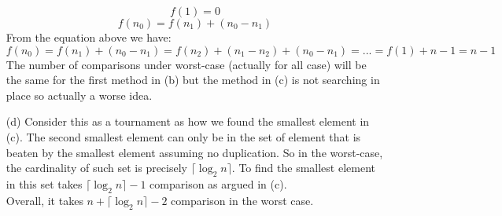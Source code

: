 \documentclass[10pt,twoside,a4paper]{article}
\begin{document}
\begin{itemize}
$$f(1)=0$$
$$f(n_0)=f(n_1)+(n_0-n_1)$$
From the equation above we have:
$$f(n_0)=f(n_1)+(n_0-n_1)=f(n_2)+(n_1-n_2)+(n_0-n_1)=...=f(1)+n-1=n-1$$
The number of comparisons under worst-case (actually for all case) will be the same for the first method in (b) but the method in  (c) is not searching in place so actually a worse idea.
\item[(d)]
Consider this as a tournament as how we found the smallest element in (c). The second smallest element can only be in the set of element that is beaten by the smallest element assuming no duplication. So in the worst-case, the cardinality of such set is precisely $\lceil\log_2n\rceil$. To find the smallest element in this set takes $\lceil\log_2n\rceil -1$ comparison as argued in (c).\\
Overall, it takes $n+\lceil\log_2n\rceil -2$ comparison in the worst case.
\end{itemize}
\end{document}
